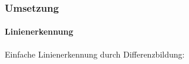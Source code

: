 \documentclass[xcolor=dvipsnames]{beamer}
\begin{document}
\begin{frame}
	\frametitle{Umsetzung}
	\framesubtitle{Linienerkennung}

	Einfache Linienerkennung durch Differenzbildung:
	\vfill
	\begin{columns}

\end{columns}
\end{frame}
\end{document}
